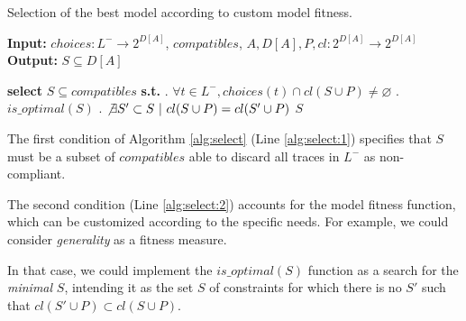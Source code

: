\begin{algorithm}
    \caption{Selection of the best model according to custom model fitness.}
    \label{alg:select}
    \textbf{Input:}  ${choices} : L^- \rightarrow 2^{D[A]}$, ${compatibles}$, $A, D[A], P, {cl}: 2^{D[A]} \rightarrow 2^{D[A]}$\\
    \textbf{Output:} $S \subseteq D[A]$
	\begin{algorithmic}[1] 
	\State \textbf{select} $S \subseteq {compatibles}$ \textbf{s.t.} \label{alg:subsetC}
	\Indent
		. $\forall t \in L^-, {choices}(t) \cap {cl}(S \cup P) \neq \varnothing$ 	\label{alg:select:1}
		. $is\_optimal(S)$									\label{alg:select:2}
		. $\not\exists S' \subset S ~|~ {cl}(S \cup P) = {cl}(S' \cup P)$		\label{alg:select:3}
	\EndIndent
	\State \Return $S$
    \EndProcedure
    \end{algorithmic}
\end{algorithm}


The first condition of Algorithm \ref{alg:select} (Line \ref{alg:select:1}) specifies that $S$ must be a subset of ${compatibles}$ able to discard all traces in $L^-$ as non-compliant.

The second condition (Line \ref{alg:select:2}) accounts for the model fitness function, which can be customized according to the specific needs. For example, we could consider \emph{generality} as a fitness measure. 
%

%
In that case, we could implement the $is\_optimal(S)$ function as a search for the \emph{minimal} $S$, intending it as the set $S$ of constraints for which there is no $S'$ such that ${cl}(S' \cup P) \subset {cl}(S \cup P)$.

